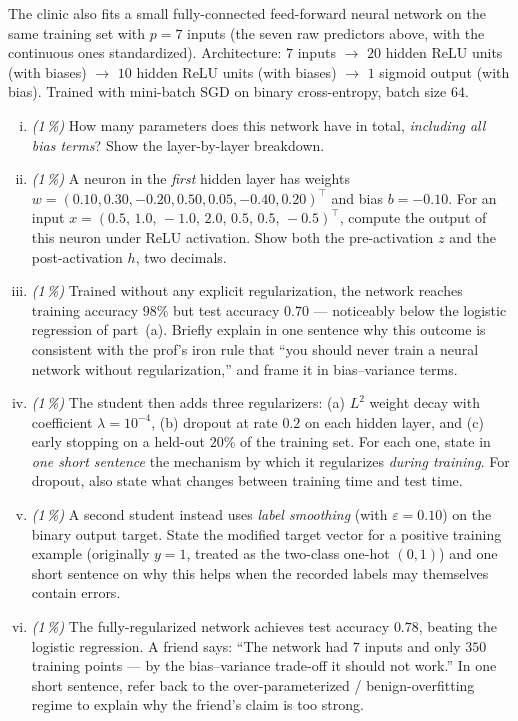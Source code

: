 \documentclass[11pt,a4paper]{article}
\newcommand{\subpoints}[1]{\textit{(#1\,\%)}}
\begin{document}
The clinic also fits a small fully-connected feed-forward neural network on the same training set with $p = 7$ inputs (the seven raw predictors above, with the continuous ones standardized). Architecture: $7$ inputs $\to$ $20$ hidden ReLU units (with biases) $\to$ $10$ hidden ReLU units (with biases) $\to$ $1$ sigmoid output (with bias). Trained with mini-batch SGD on binary cross-entropy, batch size $64$.

\begin{enumerate}[(i)]
  \item \subpoints{1} How many parameters does this network have in total, \emph{including all bias terms}? Show the layer-by-layer breakdown.

  \item \subpoints{1} A neuron in the \emph{first} hidden layer has weights $w = (0.10, 0.30, -0.20, 0.50, 0.05, -0.40, 0.20)^\top$ and bias $b = -0.10$. For an input $x = (0.5,\, 1.0,\, -1.0,\, 2.0,\, 0.5,\, 0.5,\, -0.5)^\top$, compute the output of this neuron under ReLU activation. Show both the pre-activation $z$ and the post-activation $h$, two decimals.

  \item \subpoints{1} Trained without any explicit regularization, the network reaches training accuracy $98\%$ but test accuracy $0.70$ --- noticeably below the logistic regression of part~(a). Briefly explain in one sentence why this outcome is consistent with the prof's iron rule that ``you should never train a neural network without regularization,'' and frame it in bias--variance terms.

  \item \subpoints{1} The student then adds three regularizers: (a) $L^2$ weight decay with coefficient $\lambda = 10^{-4}$, (b) dropout at rate $0.2$ on each hidden layer, and (c) early stopping on a held-out $20\%$ of the training set. For each one, state in \emph{one short sentence} the mechanism by which it regularizes \emph{during training}. For dropout, also state what changes between training time and test time.

  \item \subpoints{1} A second student instead uses \emph{label smoothing} (with $\varepsilon = 0.10$) on the binary output target. State the modified target vector for a positive training example (originally $y = 1$, treated as the two-class one-hot $(0, 1)$) and one short sentence on why this helps when the recorded labels may themselves contain errors.

  \item \subpoints{1} The fully-regularized network achieves test accuracy $0.78$, beating the logistic regression. A friend says: ``The network had $7$ inputs and only $350$ training points --- by the bias--variance trade-off it should not work.'' In one short sentence, refer back to the over-parameterized / benign-overfitting regime to explain why the friend's claim is too strong.
\end{enumerate}
\end{document}

